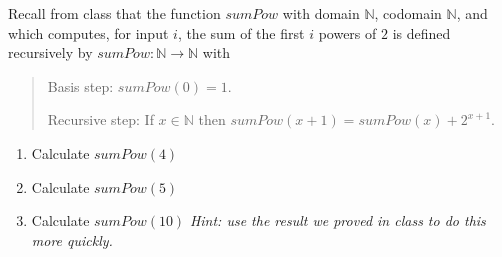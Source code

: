 
Recall from class that the function $sumPow$ with domain $\mathbb{N}$, codomain
$\mathbb{N}$, and which computes, for input $i$, the sum of the first $i$ powers of $2$ is defined
recursively by $sumPow: \mathbb{N} \to \mathbb{N}$ with

\begin{quote}
Basis step: $sumPow(0) = 1$.

Recursive step: If $x \in \mathbb{N}$ then $sumPow(x+1) = sumPow(x) + 2^{x+1}$.
\end{quote}

\begin{enumerate}
\item Calculate $sumPow(4)$
\item Calculate $sumPow(5)$
\item Calculate $sumPow(10)$ {\it Hint: use the result we proved in class to do this more quickly.}
\end{enumerate}